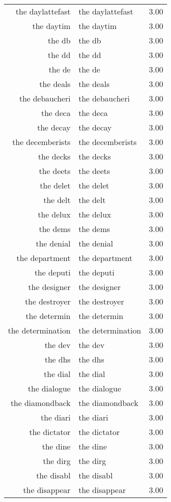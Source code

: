 \begin{table}[ht]
\begin{tabular}{rlr}
  the daylattefast & the daylattefast & 3.00 \\ 
  the daytim & the daytim & 3.00 \\ 
  the db & the db & 3.00 \\ 
  the dd & the dd & 3.00 \\ 
  the de & the de & 3.00 \\ 
  the deals & the deals & 3.00 \\ 
  the debaucheri & the debaucheri & 3.00 \\ 
  the deca & the deca & 3.00 \\ 
  the decay & the decay & 3.00 \\ 
  the decemberists & the decemberists & 3.00 \\ 
  the decks & the decks & 3.00 \\ 
  the deets & the deets & 3.00 \\ 
  the delet & the delet & 3.00 \\ 
  the delt & the delt & 3.00 \\ 
  the delux & the delux & 3.00 \\ 
  the dems & the dems & 3.00 \\ 
  the denial & the denial & 3.00 \\ 
  the department & the department & 3.00 \\ 
  the deputi & the deputi & 3.00 \\ 
  the designer & the designer & 3.00 \\ 
  the destroyer & the destroyer & 3.00 \\ 
  the determin & the determin & 3.00 \\ 
  the determination & the determination & 3.00 \\ 
  the dev & the dev & 3.00 \\ 
  the dhs & the dhs & 3.00 \\ 
  the dial & the dial & 3.00 \\ 
  the dialogue & the dialogue & 3.00 \\ 
  the diamondback & the diamondback & 3.00 \\ 
  the diari & the diari & 3.00 \\ 
  the dictator & the dictator & 3.00 \\ 
  the dine & the dine & 3.00 \\ 
  the dirg & the dirg & 3.00 \\ 
  the disabl & the disabl & 3.00 \\ 
  the disappear & the disappear & 3.00 \\ 

\end{tabular}
\end{table}
